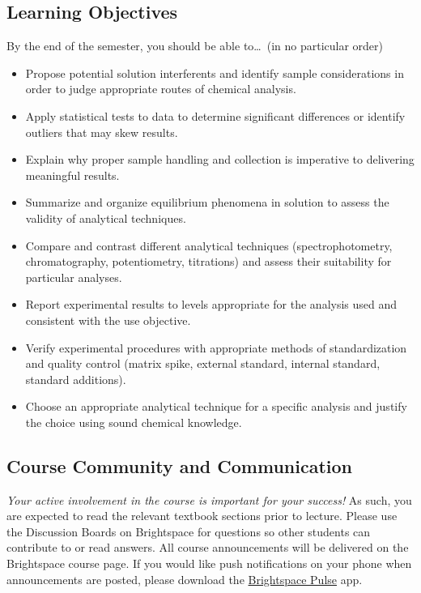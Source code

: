 \documentclass[11pt,letterpaper]{article}
\begin{document}
\subsection{Learning Objectives}
By the end of the semester, you should be able to\ldots\ (in no particular
order)
\begin{itemize}[noitemsep]
	\item Propose potential solution interferents and identify sample
		considerations in order to judge appropriate routes of chemical
		analysis.
	\item Apply statistical tests to data to determine significant
		differences or identify outliers that may skew results.
	\item Explain why proper sample handling and collection is imperative to
		delivering meaningful results.
	\item Summarize and organize equilibrium phenomena in solution to assess
		the validity of analytical techniques.
	\item Compare and contrast different analytical techniques
		(spectrophotometry, chromatography, potentiometry, titrations)
		and assess their suitability for particular analyses.
	\item Report experimental results to levels appropriate for the analysis
		used and consistent with the use objective.
	\item Verify experimental procedures with appropriate methods of
		standardization and quality control (matrix spike, external
		standard, internal standard, standard additions).
	\item Choose an appropriate analytical technique for a specific analysis
		and justify the choice using sound chemical knowledge.
\end{itemize}

\subsection{Course Community and Communication}
\emph{Your active involvement in the course is important for your success!} As
such, you are expected to read the relevant textbook sections prior to lecture.
Please use the Discussion Boards on Brightspace for questions so other students
can contribute to or read answers. All course announcements will be delivered on
the Brightspace course page. If you would like push
notifications on your phone when announcements are posted, please download the
\href{https://documentation.brightspace.com/EN/brightspace/requirements/all/pulse.htm}{Brightspace
Pulse} app.
\end{document}
